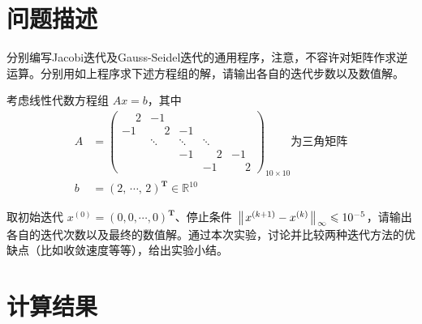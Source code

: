 \documentclass[11pt]{article}
\begin{document}
\maketitle %

\thispagestyle{empty} %

\newpage

\section{问题描述}
分别编写Jacobi迭代及Gauss-Seidel迭代的通用程序，注意，不容许对矩阵作求逆运算。分别用如上程序求下述方程组的解，请输出各自的迭代步数以及数值解。

考虑线性代数方程组 $Ax = b$，其中
\begin{align*}
    A & =
    \begin{pmatrix}
        \phantom{-}2 & -1           &        &              &              \\
        -1           & \phantom{-}2 & -1     &              &              \\
                     & \ddots       & \ddots & \ddots       &              \\
                     &              & -1     & \phantom{-}2 & -1           \\
                     &              &        & -1           & \phantom{-}2
    \end{pmatrix}_{10 \times 10}
    \text{为三角矩阵}                                       \\
    b & = (2,\, \cdots,\, 2)^\mathbf{T} \in \mathbb{R}^{10}
\end{align*}

取初始迭代 $x^{(0)} = (0, 0, \cdots, 0)^\mathbf{T}$、停止条件 $\left\Arrowvert x^{(k + 1)} - x^{(k)} \right\Arrowvert_{\infty} \leqslant 10^{-5}$，请输出各自的迭代次数以及最终的数值解。通过本次实验，讨论并比较两种迭代方法的优缺点（比如收敛速度等等），给出实验小结。

\section{计算结果}
\end{document}
